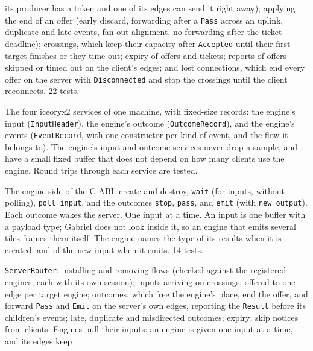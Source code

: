 \documentclass[11pt]{article}
\newcommand{\code}[1]{\texttt{#1}}
\begin{document}
\begin{description}[style=nextline, leftmargin=1.5em]
        its producer has a token and one of its edges can send it right away);
        applying the end of an offer (early discard, forwarding after a
        \code{Pass} across an uplink, duplicate and late events, fan-out
        alignment, no forwarding after the ticket deadline); crossings, which
        keep their capacity after \code{Accepted} until their first target
        finishes or they time out; expiry of offers and tickets; reports of
        offers skipped or timed out on the client's edges; and lost
        connections, which end every offer on the server with
        \code{Disconnected} and stop the crossings until the client
        reconnects. 22 tests.
  \item[Local services (\code{ipc/types.rs}, \code{services.rs},
        \code{naming.rs})] The four iceoryx2 services of one machine, with
        fixed-size records: the engine's input (\code{InputHeader}), the
        engine's outcome (\code{OutcomeRecord}), and the engine's events
        (\code{EventRecord}, with one constructor per kind of event, and the
        flow it belongs to). The engine's input and outcome services never
        drop a sample, and have a small fixed buffer that does not depend on
        how many clients use the engine. Round trips through each service are
        tested.
  \item[Engine (\code{engine.rs}, \code{ffi.rs})] The engine side of the C
        ABI: create and destroy, \code{wait} (for inputs, without polling),
        \code{poll\_input}, and the outcomes \code{stop}, \code{pass}, and
        \code{emit} (with \code{new\_output}). Each outcome wakes the server.
        One input at a time. An input is one buffer with a payload type;
        Gabriel does not look inside it, so an engine that emits several tiles
        frames them itself. The engine names the type of its results when it
        is created, and of the new input when it emits. 14 tests.
  \item[Server router (\code{routing/server\_router.rs})]
        \code{ServerRouter}: installing and removing flows (checked against
        the registered engines, each with its own session); inputs arriving on
        crossings, offered to one edge per target engine; outcomes, which free
        the engine's place, end the offer, and forward \code{Pass} and
        \code{Emit} on the server's own edges, reporting the \code{Result}
        before its children's events; late, duplicate and misdirected
        outcomes; expiry; skip notices from clients. Engines pull their
        inputs: an engine is given one input at a time, and its edges keep

\end{description}
\end{document}
